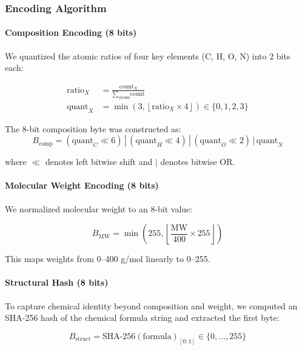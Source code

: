 \documentclass[11pt,letterpaper]{article}
\begin{document}
\subsubsection{Encoding Algorithm}

\paragraph{Composition Encoding (8 bits)}
We quantized the atomic ratios of four key elements (C, H, O, N) into 2 bits each:

\begin{align}
    \text{ratio}_X &= \frac{\text{count}_X}{\sum_{\text{atoms}} \text{count}} \\
    \text{quant}_X &= \min\left(3, \left\lfloor \text{ratio}_X \times 4 \right\rfloor \right) \in \{0,1,2,3\}
\end{align}

The 8-bit composition byte was constructed as:
\begin{equation}
    B_{\text{comp}} = (\text{quant}_C \ll 6) \,|\, (\text{quant}_H \ll 4) \,|\, (\text{quant}_O \ll 2) \,|\, \text{quant}_N
\end{equation}

where $\ll$ denotes left bitwise shift and $|$ denotes bitwise OR.

\paragraph{Molecular Weight Encoding (8 bits)}
We normalized molecular weight to an 8-bit value:

\begin{equation}
    B_{\text{MW}} = \min\left(255, \left\lfloor \frac{\text{MW}}{400} \times 255 \right\rfloor \right)
\end{equation}

This maps weights from 0--400 g/mol linearly to 0--255.

\paragraph{Structural Hash (8 bits)}
To capture chemical identity beyond composition and weight, we computed an SHA-256 hash of the chemical formula string and extracted the first byte:

\begin{equation}
    B_{\text{struct}} = \text{SHA-256}(\text{formula})_{[0:1]} \in \{0, \ldots, 255\}
\end{equation}
\end{document}
